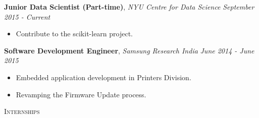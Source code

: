 \documentclass[9pt]{article}
\newenvironment{changemargin}[2]{%
  \begin{list}{}{%
    \setlength{\topsep}{0pt}%
    \setlength{\leftmargin}{#1}%
    \setlength{\rightmargin}{#2}%
    \setlength{\listparindent}{\parindent}%
    \setlength{\itemindent}{\parindent}%
    \setlength{\parsep}{\parskip}%
  }%
  \item[]}{\end{list}
}
\newcommand{\lineover}{
	\begin{changemargin}{-0.05in}{-0.05in}
		\vspace*{-8pt}
		\color{NavyBlue}
		\hrulefill \\
		\vspace*{-2pt}
	\end{changemargin}
}
\newcommand{\header}[1]{
	\begin{changemargin}{-0.5in}{-0.5in}
		\scshape{\textcolor{NavyBlue}{#1}}\\
  	\lineover
	\end{changemargin}
}
\newenvironment{body} {
	\vspace*{-16pt}
	\begin{changemargin}{-0.25in}{-0.5in}
  }	
	{\end{changemargin}
}
\begin{document}
\begin{body}
	\vspace{14pt}
		\textbf{Junior Data Scientist (Part-time)}, \emph{NYU Centre for Data Science} \hfill \emph{September 2015 - Current}\\
	\vspace*{-3pt}
	\begin{itemize} \itemsep -0pt  %
		\item Contribute to the scikit-learn project.
	\end{itemize}	
	\textbf{Software Development Engineer}, \emph{Samsung Research India} \hfill \emph{June 2014 - June 2015}\\
	\vspace*{-4pt}
	\begin{itemize} \itemsep -0pt  %
		\item Embedded application development in Printers Division.
		\item Revamping the Firmware Update process.
	\end{itemize}	
	
	

\end{body}

\smallskip



\header{Internships}
\end{document}
